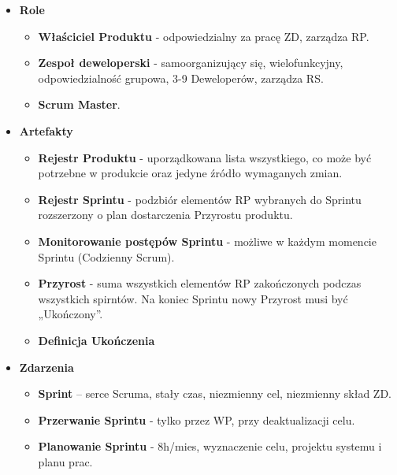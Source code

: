 \documentclass[a4paper]{article}
\begin{document}
    \begin{itemize}
        \item \textbf{Role}
        \begin{itemize}
            \item \textbf{Właściciel Produktu} - odpowiedzialny za pracę ZD, zarządza RP.

            \item \textbf{Zespoł deweloperski} - samoorganizujący się, wielofunkcyjny, odpowiedzialność grupowa, 3-9 Deweloperów, zarządza RS.

            \item \textbf{Scrum Master}.

        \end{itemize}


        \item \textbf{Artefakty}
        \begin{itemize}
            \item \textbf{Rejestr Produktu} - uporządkowana lista wszystkiego, co może być potrzebne
            w produkcie oraz jedyne źródło wymaganych zmian.

            \item \textbf{Rejestr Sprintu} - podzbiór elementów RP wybranych do Sprintu rozszerzony o plan
            dostarczenia Przyrostu produktu.

            \item \textbf{Monitorowanie postępów Sprintu} - możliwe w każdym momencie Sprintu (Codzienny Scrum).

            \item \textbf{Przyrost} - suma wszystkich elementów RP zakończonych podczas wszystkich spirntów.
            Na koniec Sprintu nowy Przyrost musi być „Ukończony”.

            \item \textbf{Definicja Ukończenia}
        \end{itemize}

        \item \textbf{Zdarzenia}

        \begin{itemize}
            \item \textbf{Sprint} – serce Scruma, stały czas, niezmienny cel, niezmienny skład ZD.

            \item \textbf{Przerwanie Sprintu} - tylko przez WP, przy deaktualizacji celu.

            \item \textbf{Planowanie Sprintu} - 8h/mies, wyznaczenie celu, projektu systemu i planu prac.


\end{itemize}
\end{itemize}
\end{document}

